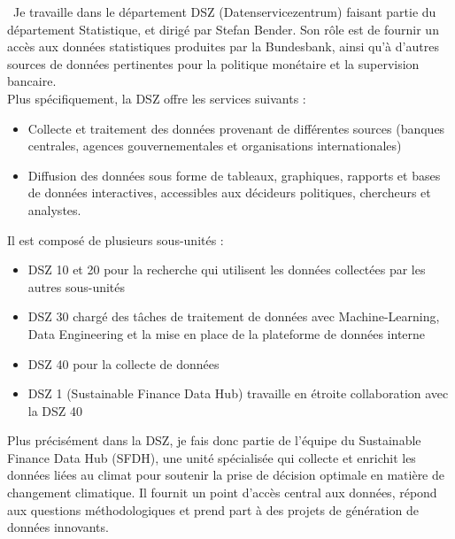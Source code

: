 ~Je travaille dans le département DSZ (Datenservicezentrum) faisant partie du département Statistique, et dirigé par Stefan Bender. Son rôle est de fournir un accès aux données statistiques produites par la Bundesbank, 
ainsi qu'à d'autres sources de données pertinentes pour la politique monétaire et la supervision bancaire.
\\
Plus spécifiquement, la DSZ offre les services suivants :
\begin{itemize}
    \item Collecte et traitement des données provenant de différentes sources (banques centrales, agences gouvernementales et organisations internationales)
    \item Diffusion des données sous forme de tableaux, graphiques, rapports et bases de données interactives, accessibles aux décideurs politiques, chercheurs et analystes.
\end{itemize}
Il est composé de plusieurs sous-unités : 
\begin{itemize}
    \item DSZ 10 et 20 pour la recherche qui utilisent les données  collectées par les autres sous-unités
    \item DSZ 30 chargé des tâches de traitement de données avec Machine-Learning, Data Engineering et la mise en place de la plateforme de données interne
    \item DSZ 40 pour la collecte de données
    \item DSZ 1 (Sustainable Finance Data Hub) travaille en étroite collaboration avec la DSZ 40
\end{itemize}

Plus précisément dans la DSZ, je fais donc partie de l'équipe du Sustainable Finance Data Hub (SFDH), une unité spécialisée qui collecte et enrichit les données liées au climat pour soutenir la prise de décision optimale en matière de changement climatique. 
Il fournit un point d'accès central aux données, répond aux questions méthodologiques et prend part à des projets de génération de données innovants.


\bigbreak




